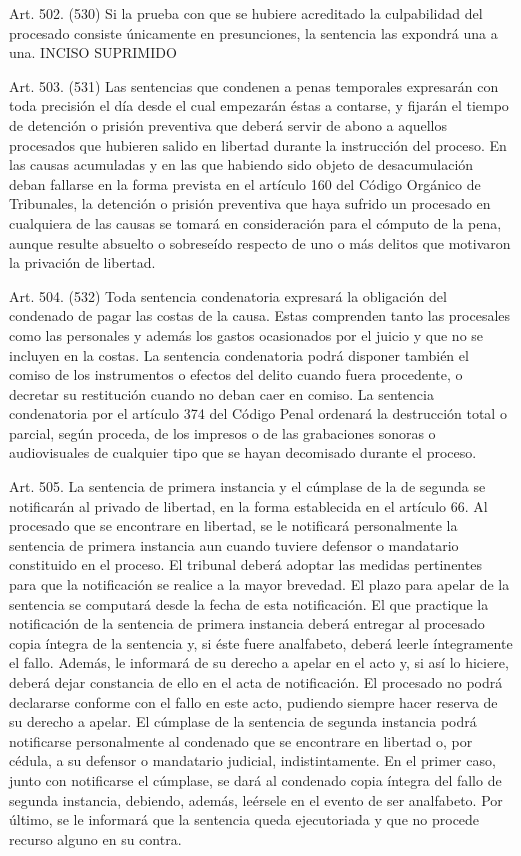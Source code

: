     Art. 502. (530) Si la prueba con que se hubiere acreditado la culpabilidad del procesado consiste únicamente en presunciones, la sentencia las expondrá una a una.
    INCISO SUPRIMIDO


    Art. 503. (531) Las sentencias que condenen a penas temporales expresarán con toda precisión el día desde el cual empezarán éstas a contarse, y fijarán el tiempo de detención o prisión preventiva que deberá servir de abono a aquellos procesados que hubieren salido en libertad durante la instrucción del proceso.
    En las causas acumuladas y en las que habiendo sido objeto de desacumulación deban fallarse en la forma prevista en el artículo 160 del Código Orgánico de Tribunales, la detención o prisión preventiva que haya sufrido un procesado en cualquiera de las causas se tomará en consideración para el cómputo de la pena, aunque resulte absuelto o sobreseído respecto de uno o más delitos que motivaron la privación de libertad.



    Art. 504. (532) Toda sentencia condenatoria expresará la obligación del condenado de pagar las costas de la causa.
    Estas comprenden tanto las procesales como las personales y además los gastos ocasionados por el juicio y que no se incluyen en la costas.
    La sentencia condenatoria podrá disponer también el comiso de los instrumentos o efectos del delito cuando fuera procedente, o decretar su restitución cuando no deban caer en comiso.
    La sentencia condenatoria por el artículo 374 del Código Penal ordenará la destrucción total o parcial, según proceda, de los impresos o de las grabaciones sonoras o audiovisuales de cualquier tipo que se hayan decomisado durante el proceso.

    Art. 505. La sentencia de primera instancia y el cúmplase de la de segunda se notificarán al privado de libertad, en la forma establecida en el artículo 66.
    Al procesado que se encontrare en libertad, se le notificará personalmente la sentencia de primera instancia aun cuando tuviere defensor o mandatario constituido en el proceso. El tribunal deberá adoptar las medidas pertinentes para que la notificación se realice a la mayor brevedad. El plazo para apelar de la sentencia se computará desde la fecha de esta notificación.
    El que practique la notificación de la sentencia de primera instancia deberá entregar al procesado copia íntegra de la sentencia y, si éste fuere analfabeto, deberá leerle íntegramente el fallo. Además, le informará de su derecho a apelar en el acto y, si así lo hiciere, deberá dejar constancia de ello en el acta de notificación. El procesado no podrá declararse conforme con el fallo en este acto, pudiendo siempre hacer reserva de su derecho a apelar.
    El cúmplase de la sentencia de segunda instancia podrá notificarse personalmente al condenado que se encontrare en libertad o, por cédula, a su defensor o mandatario judicial, indistintamente. En el primer caso, junto con notificarse el cúmplase, se dará al condenado copia íntegra del fallo de segunda instancia, debiendo, además, leérsele en el evento de ser analfabeto. Por último, se le informará que la sentencia queda ejecutoriada y que no procede recurso alguno en su contra.

